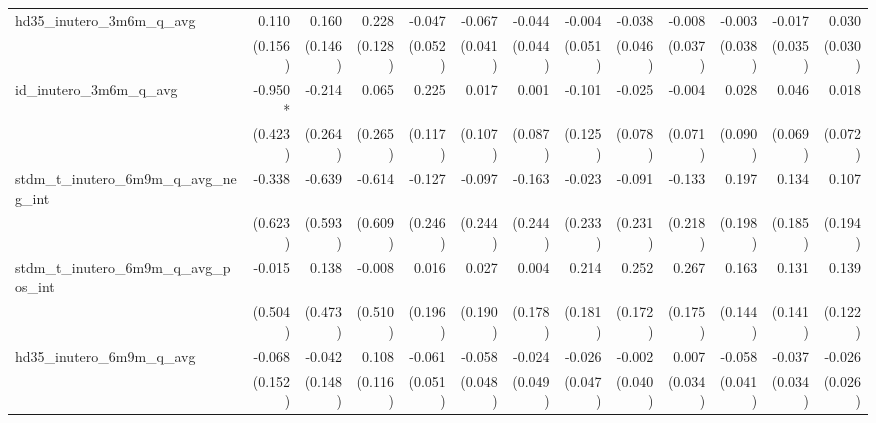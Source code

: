 \begin{tabular}{lrrrrrrrrrrrr}
hd35\_inutero\_3m6m\_q\_avg                 &        0.110 &        0.160 &        0.228 &       -0.047 &       -0.067 &       -0.044 &       -0.004 &       -0.038 &       -0.008 &       -0.003 &       -0.017 &        0.030 \\ 
                                            &      (0.156) &      (0.146) &      (0.128) &      (0.052) &      (0.041) &      (0.044) &      (0.051) &      (0.046) &      (0.037) &      (0.038) &      (0.035) &      (0.030) \\ 
id\_inutero\_3m6m\_q\_avg                   &      -0.950* &       -0.214 &        0.065 &        0.225 &        0.017 &        0.001 &       -0.101 &       -0.025 &       -0.004 &        0.028 &        0.046 &        0.018 \\ 
                                            &      (0.423) &      (0.264) &      (0.265) &      (0.117) &      (0.107) &      (0.087) &      (0.125) &      (0.078) &      (0.071) &      (0.090) &      (0.069) &      (0.072) \\ 
stdm\_t\_inutero\_6m9m\_q\_avg\_neg\_int    &       -0.338 &       -0.639 &       -0.614 &       -0.127 &       -0.097 &       -0.163 &       -0.023 &       -0.091 &       -0.133 &        0.197 &        0.134 &        0.107 \\ 
                                            &      (0.623) &      (0.593) &      (0.609) &      (0.246) &      (0.244) &      (0.244) &      (0.233) &      (0.231) &      (0.218) &      (0.198) &      (0.185) &      (0.194) \\ 
stdm\_t\_inutero\_6m9m\_q\_avg\_pos\_int    &       -0.015 &        0.138 &       -0.008 &        0.016 &        0.027 &        0.004 &        0.214 &        0.252 &        0.267 &        0.163 &        0.131 &        0.139 \\ 
                                            &      (0.504) &      (0.473) &      (0.510) &      (0.196) &      (0.190) &      (0.178) &      (0.181) &      (0.172) &      (0.175) &      (0.144) &      (0.141) &      (0.122) \\ 
hd35\_inutero\_6m9m\_q\_avg                 &       -0.068 &       -0.042 &        0.108 &       -0.061 &       -0.058 &       -0.024 &       -0.026 &       -0.002 &        0.007 &       -0.058 &       -0.037 &       -0.026 \\ 
                                            &      (0.152) &      (0.148) &      (0.116) &      (0.051) &      (0.048) &      (0.049) &      (0.047) &      (0.040) &      (0.034) &      (0.041) &      (0.034) &      (0.026) \\ 

\end{tabular}
